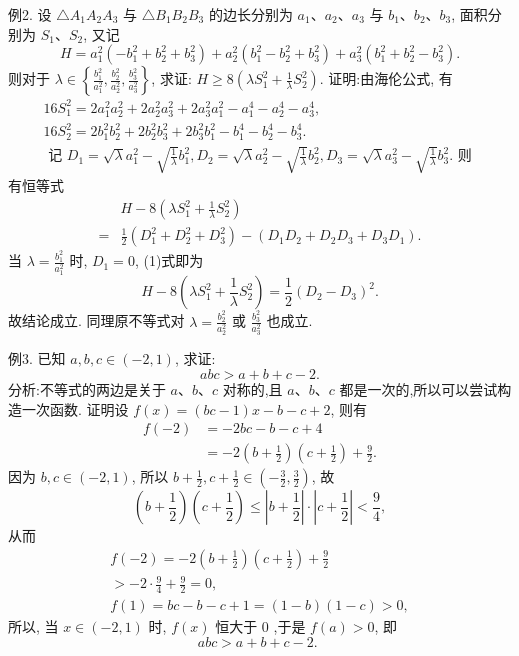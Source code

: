 例2. 设 $\triangle A_1 A_2 A_3$ 与 $\triangle B_1 B_2 B_3$ 的边长分别为 $a_1 、 a_2 、 a_3$ 与 $b_1 、 b_2 、 b_3$, 面积分别为 $S_1 、 S_2$, 又记
$$
H=a_1^2\left(-b_1^2+b_2^2+b_3^2\right)+a_2^2\left(b_1^2-b_2^2+b_3^2\right)+a_3^2\left(b_1^2+b_2^2-b_3^2\right) .
$$
则对于 $\lambda \in\left\{\frac{b_1^2}{a_1^2}, \frac{b_2^2}{a_2^2}, \frac{b_3^2}{a_3^2}\right\}$, 求证: $H \geqslant 8\left(\lambda S_1^2+\frac{1}{\lambda} S_2^2\right)$.
证明:由海伦公式, 有
$$
\begin{gathered}
16 S_1^2=2 a_1^2 a_2^2+2 a_2^2 a_3^2+2 a_3^2 a_1^2-a_1^4-a_2^4-a_3^4, \\
16 S_2^2=2 b_1^2 b_2^2+2 b_2^2 b_3^2+2 b_3^2 b_1^2-b_1^4-b_2^4-b_3^4 . \\
\text { 记 } D_1=\sqrt{\lambda} a_1^2-\sqrt{\frac{1}{\lambda}} b_1^2, D_2=\sqrt{\lambda} a_2^2-\sqrt{\frac{1}{\lambda}} b_2^2, D_3=\sqrt{\lambda} a_3^2-\sqrt{\frac{1}{\lambda}} b_3^2 . \text { 则 }
\end{gathered}
$$
有恒等式
$$
\begin{aligned}
& H-8\left(\lambda S_1^2+\frac{1}{\lambda} S_2^2\right) \\
= & \frac{1}{2}\left(D_1^2+D_2^2+D_3^2\right)-\left(D_1 D_2+D_2 D_3+D_3 D_1\right) .
\end{aligned} \label{(1)}
$$
当 $\lambda=\frac{b_1^2}{a_1^2}$ 时, $D_1=0$, (1)式即为
$$
H-8\left(\lambda S_1^2+\frac{1}{\lambda} S_2^2\right)=\frac{1}{2}\left(D_2-D_3\right)^2 .
$$
故结论成立.
同理原不等式对 $\lambda=\frac{b_2^2}{a_2^2}$ 或 $\frac{b_3^2}{a_3^2}$ 也成立.



例3. 已知 $a, b, c \in(-2,1)$, 求证:
$$
a b c>a+b+c-2 .
$$
分析:不等式的两边是关于 $a 、 b 、 c$ 对称的,且 $a 、 b 、 c$ 都是一次的,所以可以尝试构造一次函数.
证明设 $f(x)=(b c-1) x-b-c+2$, 则有
$$
\begin{aligned}
f(-2) & =-2 b c-b-c+4 \\
& =-2\left(b+\frac{1}{2}\right)\left(c+\frac{1}{2}\right)+\frac{9}{2} .
\end{aligned}
$$
因为 $b, c \in(-2,1)$, 所以 $b+\frac{1}{2}, c+\frac{1}{2} \in\left(-\frac{3}{2}, \frac{3}{2}\right)$, 故
$$
\left(b+\frac{1}{2}\right)\left(c+\frac{1}{2}\right) \leqslant\left|b+\frac{1}{2}\right| \cdot\left|c+\frac{1}{2}\right|<\frac{9}{4},
$$
从而
$$
\begin{gathered}
f(-2)=-2\left(b+\frac{1}{2}\right)\left(c+\frac{1}{2}\right)+\frac{9}{2} \\
>-2 \cdot \frac{9}{4}+\frac{9}{2}=0, \\
f(1)=b c-b-c+1=(1-b)(1-c)>0,
\end{gathered}
$$
所以, 当 $x \in(-2,1)$ 时, $f(x)$ 恒大于 0 ,于是 $f(a)>0$, 即
$$
a b c>a+b+c-2 \text {. }
$$



